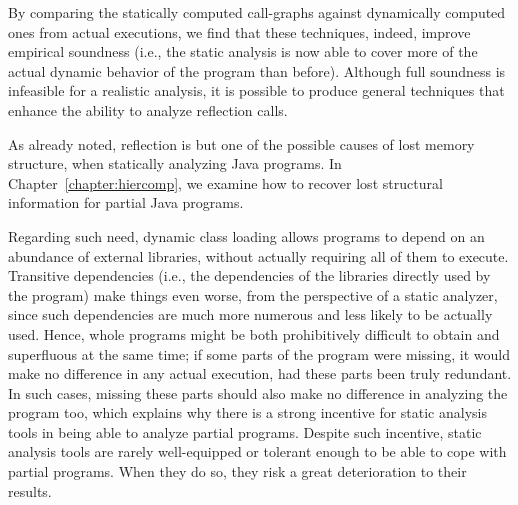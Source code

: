 By comparing the statically computed call-graphs against dynamically
computed ones from actual executions, we find that these techniques,
indeed, improve empirical soundness (i.e., the static analysis is now
able to cover more of the actual dynamic behavior of the program than
before). Although full soundness is infeasible for a realistic
analysis, it is possible to produce general techniques that enhance
the ability to analyze reflection calls.

As already noted, reflection is but one of the possible causes of lost
memory structure, when statically analyzing Java programs. In
Chapter~\ref{chapter:hiercomp}, we examine how to recover lost
structural information for partial Java programs.


Regarding such need, dynamic class loading allows programs to depend
on an abundance of external libraries, without actually requiring all
of them to execute. Transitive dependencies (i.e., the dependencies of
the libraries directly used by the program) make things even worse,
from the perspective of a static analyzer, since such dependencies are
much more numerous and less likely to be actually used. Hence, whole
programs might be both prohibitively difficult to obtain and
superfluous at the same time; if some parts of the program were
missing, it would make no difference in any actual execution, had
these parts been truly redundant. In such cases, missing these parts
should also make no difference in analyzing the program too, which
explains why there is a strong incentive for static analysis tools in
being able to analyze partial programs. Despite such incentive, static
analysis tools are rarely well-equipped or tolerant enough to be able
to cope with partial programs. When they do so, they risk a great
deterioration to their results.

